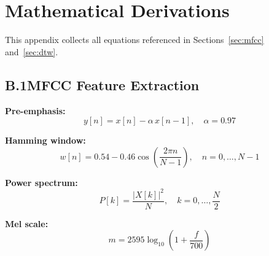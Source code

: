 \documentclass[conference]{IEEEtran}
\begin{document}
%
%
%

\appendix
\section{Mathematical Derivations}
\label{app:math}

This appendix collects all equations referenced in
Sections~\ref{sec:mfcc} and~\ref{sec:dtw}.

\subsection*{B.1\quad MFCC Feature Extraction}

\textbf{Pre-emphasis:}
\begin{equation}
  y[n] = x[n] - \alpha\, x[n-1], \quad \alpha = 0.97
  \label{eq:preemphasis}
\end{equation}

\textbf{Hamming window:}
\begin{equation}
  w[n] = 0.54 - 0.46\cos\!\left(\frac{2\pi n}{N-1}\right),
  \quad n = 0,\ldots,N-1
  \label{eq:hamming}
\end{equation}

\textbf{Power spectrum:}
\begin{equation}
  P[k] = \frac{|X[k]|^2}{N}, \quad k = 0,\ldots,\frac{N}{2}
  \label{eq:powspec}
\end{equation}

\textbf{Mel scale:}
\begin{equation}
  m = 2595\log_{10}\!\left(1 + \frac{f}{700}\right)
  \label{eq:meltohz}
\end{equation}
\end{document}
